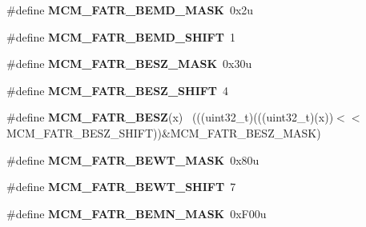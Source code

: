 \begin{DoxyCompactItemize}
\item 
\hypertarget{group___m_c_m___register___masks_gaa9a19e487ded131750a946c48530d019}{}\#define {\bfseries M\+C\+M\+\_\+\+F\+A\+T\+R\+\_\+\+B\+E\+M\+D\+\_\+\+M\+A\+S\+K}~0x2u\label{group___m_c_m___register___masks_gaa9a19e487ded131750a946c48530d019}

\item 
\hypertarget{group___m_c_m___register___masks_ga52f6e87f68250a4589848006f701fd9c}{}\#define {\bfseries M\+C\+M\+\_\+\+F\+A\+T\+R\+\_\+\+B\+E\+M\+D\+\_\+\+S\+H\+I\+F\+T}~1\label{group___m_c_m___register___masks_ga52f6e87f68250a4589848006f701fd9c}

\item 
\hypertarget{group___m_c_m___register___masks_ga3d5eacf1f7df099fc55e2246999bfb13}{}\#define {\bfseries M\+C\+M\+\_\+\+F\+A\+T\+R\+\_\+\+B\+E\+S\+Z\+\_\+\+M\+A\+S\+K}~0x30u\label{group___m_c_m___register___masks_ga3d5eacf1f7df099fc55e2246999bfb13}

\item 
\hypertarget{group___m_c_m___register___masks_ga1a5e26672a5de171d63be1ca77b3d30b}{}\#define {\bfseries M\+C\+M\+\_\+\+F\+A\+T\+R\+\_\+\+B\+E\+S\+Z\+\_\+\+S\+H\+I\+F\+T}~4\label{group___m_c_m___register___masks_ga1a5e26672a5de171d63be1ca77b3d30b}

\item 
\hypertarget{group___m_c_m___register___masks_gac6b8b31e125ab54f4cf8a2a7017d9073}{}\#define {\bfseries M\+C\+M\+\_\+\+F\+A\+T\+R\+\_\+\+B\+E\+S\+Z}(x)                                              ~(((uint32\+\_\+t)(((uint32\+\_\+t)(x))$<$$<$M\+C\+M\+\_\+\+F\+A\+T\+R\+\_\+\+B\+E\+S\+Z\+\_\+\+S\+H\+I\+F\+T))\&M\+C\+M\+\_\+\+F\+A\+T\+R\+\_\+\+B\+E\+S\+Z\+\_\+\+M\+A\+S\+K)\label{group___m_c_m___register___masks_gac6b8b31e125ab54f4cf8a2a7017d9073}

\item 
\hypertarget{group___m_c_m___register___masks_gaad2ac73258e43540565a3a280ee66fb0}{}\#define {\bfseries M\+C\+M\+\_\+\+F\+A\+T\+R\+\_\+\+B\+E\+W\+T\+\_\+\+M\+A\+S\+K}~0x80u\label{group___m_c_m___register___masks_gaad2ac73258e43540565a3a280ee66fb0}

\item 
\hypertarget{group___m_c_m___register___masks_gaef65093e7805e4cb18739511830353f5}{}\#define {\bfseries M\+C\+M\+\_\+\+F\+A\+T\+R\+\_\+\+B\+E\+W\+T\+\_\+\+S\+H\+I\+F\+T}~7\label{group___m_c_m___register___masks_gaef65093e7805e4cb18739511830353f5}

\item 
\hypertarget{group___m_c_m___register___masks_ga472ab194632f95ffe3709430d8e48e23}{}\#define {\bfseries M\+C\+M\+\_\+\+F\+A\+T\+R\+\_\+\+B\+E\+M\+N\+\_\+\+M\+A\+S\+K}~0x\+F00u\label{group___m_c_m___register___masks_ga472ab194632f95ffe3709430d8e48e23}


\end{DoxyCompactItemize}
